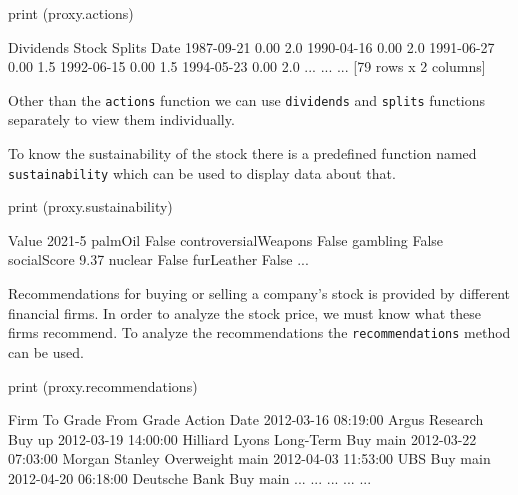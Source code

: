 \begin{ipythonnon}
print (proxy.actions)
\end{ipythonnon}
\begin{ioutput}
            Dividends  Stock Splits
Date                               
1987-09-21       0.00           2.0
1990-04-16       0.00           2.0
1991-06-27       0.00           1.5
1992-06-15       0.00           1.5
1994-05-23       0.00           2.0
...               ...           ...
[79 rows x 2 columns]
\end{ioutput}

Other than the \texttt{actions} function we can use \texttt{dividends} and \texttt{splits} functions separately to view them individually.

To know the sustainability of the stock there is a predefined function named \texttt{sustainability} which can be used to display data about that.

\begin{ipythonnon}
print (proxy.sustainability)
\end{ipythonnon}
\begin{ioutput}
                                     Value
2021-5                                    
palmOil                              False
controversialWeapons                 False
gambling                             False
socialScore                           9.37
nuclear                              False
furLeather                           False
...
\end{ioutput}

Recommendations for buying or selling a company’s stock is provided by different financial firms. In order to analyze the stock price, we must know what these firms recommend. To analyze the recommendations the \texttt{recommendations} method can be used.

\begin{ipythonnon}
print (proxy.recommendations)
\end{ipythonnon}
\begin{ioutput}
                               Firm       To Grade From Grade Action
Date                                                                
2012-03-16 08:19:00  Argus Research            Buy                up
2012-03-19 14:00:00  Hilliard Lyons  Long-Term Buy              main
2012-03-22 07:03:00  Morgan Stanley     Overweight              main
2012-04-03 11:53:00             UBS            Buy              main
2012-04-20 06:18:00   Deutsche Bank            Buy              main
...                             ...            ...        ...    ...
\end{ioutput}

